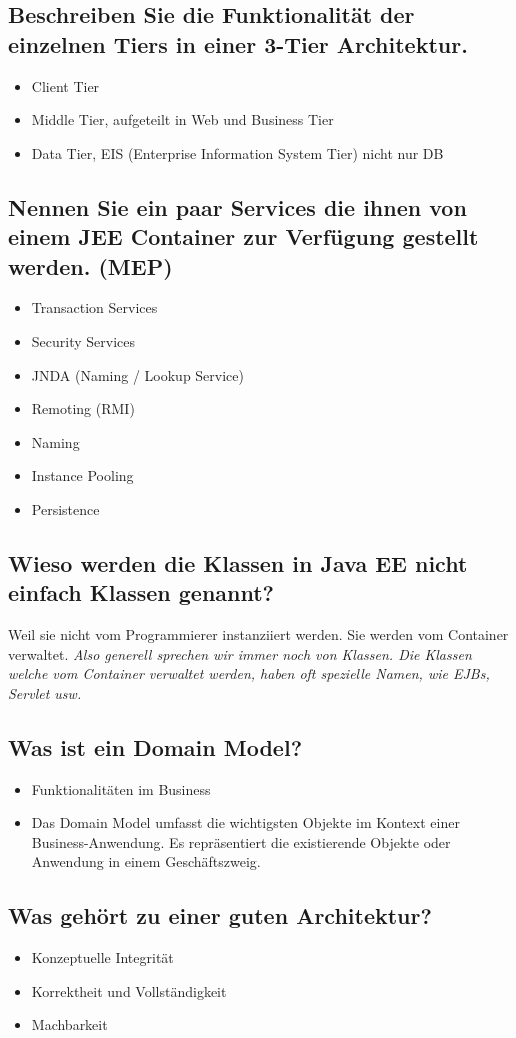 \subsection{Beschreiben Sie die Funktionalität der einzelnen Tiers in einer 3-Tier Architektur.}
\begin{itemize}
	\item Client Tier
	\item Middle Tier, aufgeteilt in Web und Business Tier
	\item Data Tier, EIS (Enterprise Information System Tier) nicht nur DB 
\end{itemize}

\subsection{Nennen Sie ein paar Services die ihnen von einem JEE Container zur Verfügung gestellt werden. (MEP)}
\begin{itemize}
	\item Transaction Services
	\item Security Services 
	\item JNDA (Naming / Lookup Service)
	\item Remoting (RMI)
	\item Naming
	\item Instance Pooling
	\item Persistence
\end{itemize}

\subsection{Wieso werden die Klassen in Java EE nicht einfach Klassen genannt?}
Weil sie nicht vom Programmierer instanziiert werden. Sie werden vom Container verwaltet. \emph{Also generell sprechen wir immer noch von Klassen. Die Klassen welche vom Container verwaltet werden, haben oft spezielle Namen, wie EJBs, Servlet usw.}

\subsection{Was ist ein Domain Model?}
\begin{itemize}
	\item Funktionalitäten im Business
	\item Das Domain Model umfasst die wichtigsten Objekte im Kontext einer Business-Anwendung. Es repräsentiert die existierende Objekte oder Anwendung in einem Geschäftszweig.
\end{itemize}

\subsection{Was gehört zu einer guten Architektur?}
\begin{itemize}
	\item Konzeptuelle Integrität
	\item Korrektheit und Vollständigkeit
	\item Machbarkeit
\end{itemize}
